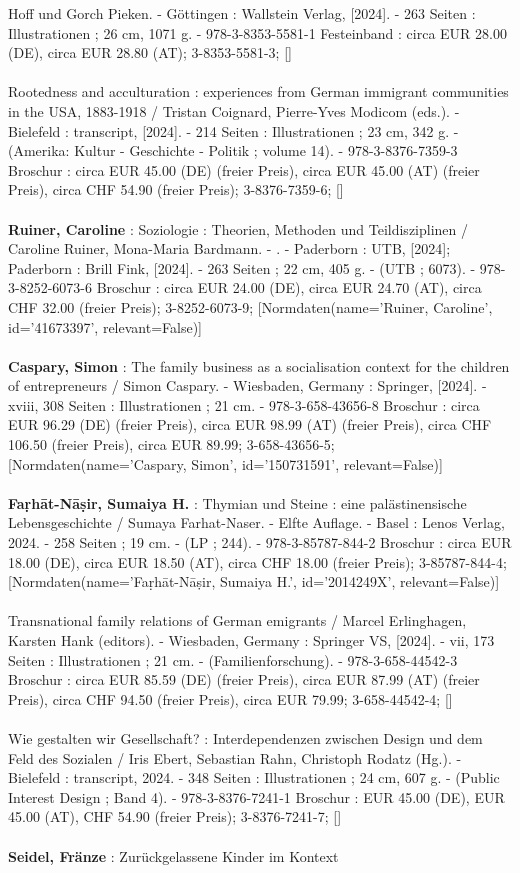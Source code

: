 \documentclass{article}
\begin{document}
\begin{multicols}{3}
Hoff und Gorch Pieken. - Göttingen : Wallstein Verlag, [2024]. - 263 Seiten : Illustrationen ; 26 cm, 1071 g. - 978-3-8353-5581-1 Festeinband : circa EUR 28.00 (DE), circa EUR 28.80 (AT); 3-8353-5581-3; []\\\\Rootedness and acculturation : experiences from German immigrant communities in the USA, 1883-1918 / Tristan Coignard, Pierre-Yves Modicom (eds.). - Bielefeld : transcript, [2024]. - 214 Seiten : Illustrationen ; 23 cm, 342 g. - (Amerika: Kultur - Geschichte - Politik ; volume 14). - 978-3-8376-7359-3 Broschur : circa EUR 45.00 (DE) (freier Preis), circa EUR 45.00 (AT) (freier Preis), circa CHF 54.90 (freier Preis); 3-8376-7359-6; []\\\\\textbf{Ruiner, Caroline} : Soziologie : Theorien, Methoden und Teildisziplinen / Caroline Ruiner, Mona-Maria Bardmann. - . - Paderborn : UTB, [2024]; Paderborn : Brill Fink, [2024]. - 263 Seiten ; 22 cm, 405 g. - (UTB ; 6073). - 978-3-8252-6073-6 Broschur : circa EUR 24.00 (DE), circa EUR 24.70 (AT), circa CHF 32.00 (freier Preis); 3-8252-6073-9; [Normdaten(name='Ruiner, Caroline', id='41673397', relevant=False)]\\\\\textbf{Caspary, Simon} : The family business as a socialisation context for the children of entrepreneurs / Simon Caspary. - Wiesbaden, Germany : Springer, [2024]. - xviii, 308 Seiten : Illustrationen ; 21 cm. - 978-3-658-43656-8 Broschur : circa EUR 96.29 (DE) (freier Preis), circa EUR 98.99 (AT) (freier Preis), circa CHF 106.50 (freier Preis), circa EUR 89.99; 3-658-43656-5; [Normdaten(name='Caspary, Simon', id='150731591', relevant=False)]\\\\\textbf{Faṛhāt-Nāṣir, Sumaiya H.} : Thymian und Steine : eine palästinensische Lebensgeschichte / Sumaya Farhat-Naser. - Elfte Auflage. - Basel : Lenos Verlag, 2024. - 258 Seiten ; 19 cm. - (LP ; 244). - 978-3-85787-844-2 Broschur : circa EUR 18.00 (DE), circa EUR 18.50 (AT), circa CHF 18.00 (freier Preis); 3-85787-844-4; [Normdaten(name='Faṛhāt-Nāṣir, Sumaiya H.', id='2014249X', relevant=False)]\\\\Transnational family relations of German emigrants / Marcel Erlinghagen, Karsten Hank (editors). - Wiesbaden, Germany : Springer VS, [2024]. - vii, 173 Seiten : Illustrationen ; 21 cm. - (Familienforschung). - 978-3-658-44542-3 Broschur : circa EUR 85.59 (DE) (freier Preis), circa EUR 87.99 (AT) (freier Preis), circa CHF 94.50 (freier Preis), circa EUR 79.99; 3-658-44542-4; []\\\\Wie gestalten wir Gesellschaft? : Interdependenzen zwischen Design und dem Feld des Sozialen / Iris Ebert, Sebastian Rahn, Christoph Rodatz (Hg.). - Bielefeld : transcript, 2024. - 348 Seiten : Illustrationen ; 24 cm, 607 g. - (Public Interest Design ; Band 4). - 978-3-8376-7241-1 Broschur : EUR 45.00 (DE), EUR 45.00 (AT), CHF 54.90 (freier Preis); 3-8376-7241-7; []\\\\\textbf{Seidel, Fränze} : Zurückgelassene Kinder im Kontext 
\end{multicols}
\end{document}
